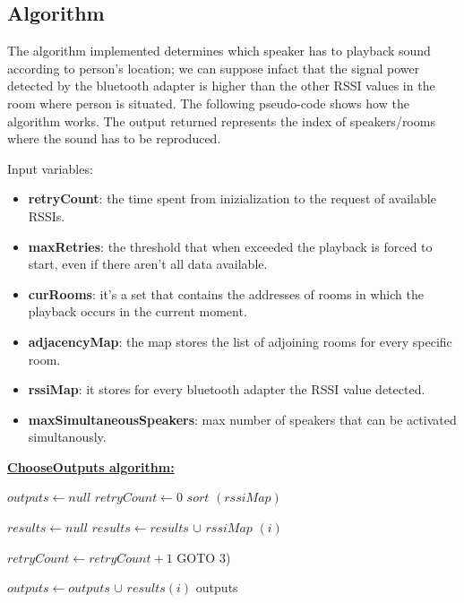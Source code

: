 \documentclass[conference]{./IEEEtran}
\begin{document}
\subsection{Algorithm}
The algorithm implemented determines which speaker has to playback sound according to person's location; we can suppose infact that the signal power detected by the bluetooth adapter is higher than the other RSSI values in the room where person is situated. The following pseudo-code shows how the algorithm works. The output returned represents the index of speakers/rooms where the sound has to be reproduced.

Input variables:
\begin{itemize}
\item \textbf{retryCount}: the time spent from inizialization to the request of available RSSIs.
\item \textbf{maxRetries}: the threshold that when exceeded the playback is forced to start, even if there aren't all data available.
\item \textbf{curRooms}: it's a set that contains the addresses of rooms in which the playback occurs in the current moment.
\item \textbf{adjacencyMap}: the map stores the list of adjoining rooms for every specific room.   
\item \textbf{rssiMap}: it stores for every bluetooth adapter the RSSI value detected.
\item \textbf{maxSimultaneousSpeakers}: max number of speakers that can be activated simultanously.
\end{itemize}
\textbf{\underline{ChooseOutputs algorithm:}}
\vspace{0.3cm}
\begin{algorithmic}[1]

\STATE $outputs \gets null$ 
\STATE $retryCount \gets 0$
\STATE $sort$ $(rssiMap)$  

\STATE $results \gets null$
\STATE $results \gets results$ $\cup$ $rssiMap$ $(i)$ 
\ENDFOR

\STATE $ retryCount \gets retryCount + 1 $ 
\STATE GOTO 3)
\ENDIF

		\STATE $outputs \gets outputs$ $\cup$ $results(i)$ 
	\ENDIF
\ENDFOR
\RETURN outputs
\end{algorithmic}
\end{document}
